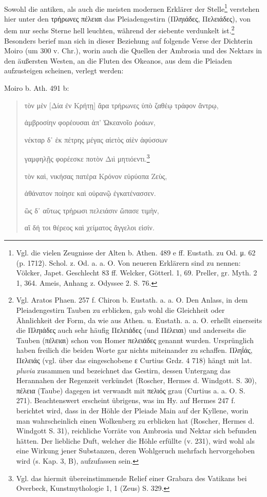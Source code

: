 \documentclass[a4paper, 11pt, oneside]{article}
\begin{document}
\paragraph{}
Sowohl die antiken, als auch die meisten modernen Erklärer der Stelle\footnote{Vgl. die vielen Zeugnisse der Alten b. Athen. 489 e ff. Eustath. zu Od. μ. 62 (p. 1712). Schol. z. Od. a. a. O. Von neueren Erklärern sind zu nennen: Völcker, Japet. Geschlecht 83 ff. Welcker, Götterl. 1, 69. Preller, gr. Myth. 2 1, 364. Ameis, Anhang z. Odyssee 2. S. 76.} verstehen hier unter den τρήρωνες πέλειαι das Pleiadengestirn (Πληιάδες, Πελειάδες), von dem nur sechs Sterne hell leuchten, während der siebente verdunkelt ist.\footnote{Vgl. Aratos Phaen. 257 f. Chiron b. Eustath. a. a. O. Den Anlass, in dem Pleiadengestirn Tauben zu erblicken, gab wohl die Gleichheit oder Ähnlichkeit der Form, da wie aus Athen. u. Eustath. a. a. O. erhellt einerseits die Πληιάδες auch sehr häufig Πελειάδες (und Πέλειαι) und anderseits die Tauben (πέλειαι) schon von Homer πελειάδες genannt wurden. Ursprünglich haben freilich die beiden Worte gar nichts miteinander zu schaffen. Πληΐάς, Πελειάς (vgl. über das eingeschobene ε Curtius Grdz. 4 718) hängt mit lat. \emph{pluvia} zusammen und bezeichnet das Gestirn, dessen Untergang das Herannahen der Regenzeit verkündet (Roscher, Hermes d. Windgott. S. 30), πέλεια (Taube) dagegen ist verwandt mit πελιός grau (Curtius a. a. O. S. 271). Beachtenswert erscheint übrigens, was im Hy. auf Hermes 247 f. berichtet wird, dass in der Höhle der Pleiade Main auf der Kyllene, worin man wahrscheinlich einen Wolkenberg zu erblicken hat (Roscher, Hermes d. Windgott S. 31), reichliche Vorräte von Ambrosia und Nektar sich befunden hätten. Der liebliche Duft, welcher die Höhle erfüllte (v. 231), wird wohl als eine Wirkung jener Substanzen, deren Wohlgeruch mehrfach hervorgehoben wird (s. Kap. 3, B), aufzufassen sein.} Besonders berief man sich in dieser Beziehung auf folgende Verse der Dichterin Moiro (um 300 v. Chr.), worin auch die Quellen der Ambrosia und des Nektars in den äußersten Westen, an die Fluten des Okeanos, aus dem die Pleiaden aufzusteigen scheinen, verlegt werden:

Moiro b. Ath. 491 b:
\begin{quotation}\large
τὸν μὲν [Δία ἐν Κρήτῃ] ἄρα τρήρωνες ὑπὸ ζαθέῳ τράφον ἄντρῳ,

ἀμβροσίην φορέουσαι ἀπ' Ὠκεανοῖο ῥοάων,

νέκταρ δ᾽ ἐκ πέτρης μέγας αἰετὸς αἰὲν ἀφύσσων

γαμφηλῇς φορέεσκε ποτὸν Διὶ μητιόεντι.\footnote{Vgl. das hiermit übereinstimmende Relief einer Grabara des Vatikans bei Overbeck, Kunstmythologie 1, 1 (Zeus) S. 329.}

\bigskip

τὸν καὶ, νικήσας πατέρα Κρόνον εὐρύοπα Ζεὺς,

ἀθάνατον ποίησε καὶ οὐρανῷ ἐγκατένασσεν.

ὣς δ᾽ αὕτως τρήρωσι πελειάσιν ὥπασε τιμὴν,

αἳ δή τοι θέρεος καὶ χείματος ἄγγελοι εἰσίν.
\end{quotation}
\end{document}
